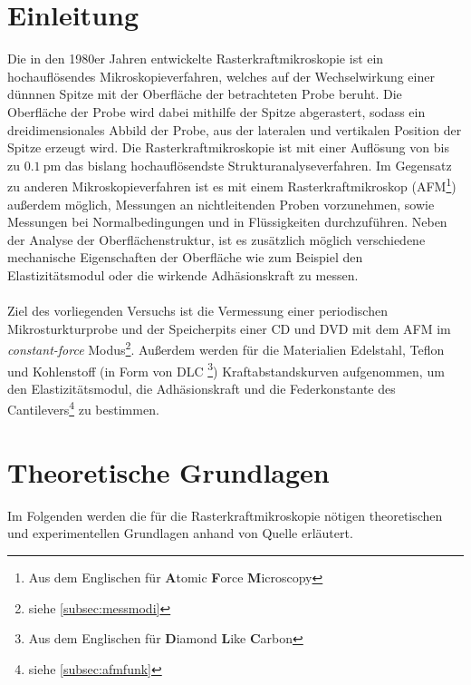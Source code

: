 \setcounter{page}{1}
\section*{Einleitung}
Die in den 1980er Jahren entwickelte Rasterkraftmikroskopie ist ein hochauflösendes Mikroskopieverfahren, welches auf der Wechselwirkung einer dünnnen Spitze mit der Oberfläche der betrachteten Probe beruht. Die Oberfläche der Probe wird dabei mithilfe der Spitze abgerastert, sodass ein dreidimensionales Abbild der Probe, aus der lateralen und vertikalen Position der Spitze erzeugt wird. Die Rasterkraftmikroskopie ist mit einer Auflösung von bis zu $\SI{0,1}{\pico\meter}$ das bislang hochauflösendste Strukturanalyseverfahren. Im Gegensatz zu anderen Mikroskopieverfahren ist es mit einem Rasterkraftmikroskop (AFM\footnote{Aus dem Englischen für \textbf{A}tomic \textbf{F}orce \textbf{M}icroscopy}) außerdem möglich, Messungen an nichtleitenden Proben vorzunehmen, sowie Messungen bei Normalbedingungen und in Flüssigkeiten durchzuführen. Neben der Analyse der Oberflächenstruktur, ist es zusätzlich möglich verschiedene mechanische Eigenschaften der Oberfläche wie zum Beispiel den Elastizitätsmodul oder die wirkende Adhäsionskraft zu messen. \\
\\
Ziel des vorliegenden Versuchs ist die Vermessung einer periodischen Mikrosturkturprobe und der Speicherpits einer CD und DVD mit dem AFM im \textit{constant-force} Modus\footnote{siehe \autoref{subsec:messmodi}}. Außerdem werden für die Materialien Edelstahl, Teflon und Kohlenstoff (in Form von DLC \footnote{Aus dem Englischen für \textbf{D}iamond \textbf{L}ike \textbf{C}arbon}) Kraftabstandskurven aufgenommen, um den Elastizitätsmodul, die Adhäsionskraft und die Federkonstante des Cantilevers\footnote{siehe \autoref{subsec:afmfunk}} zu bestimmen.
\newpage
\section{Theoretische Grundlagen}
Im Folgenden werden die für die Rasterkraftmikroskopie nötigen theoretischen und experimentellen Grundlagen anhand von Quelle \cite{Voigt} erläutert.
